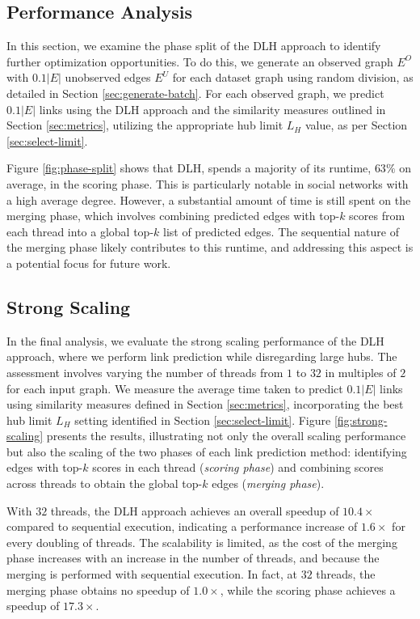 \subsection{Performance Analysis}

In this section, we examine the phase split of the DLH approach to identify further optimization opportunities. To do this, we generate an observed graph $E^O$ with $0.1|E|$ unobserved edges $E^U$ for each dataset graph using random division, as detailed in Section \ref{sec:generate-batch}. For each observed graph, we predict $0.1|E|$ links using the DLH approach and the similarity measures outlined in Section \ref{sec:metrics}, utilizing the appropriate hub limit $L_H$ value, as per Section \ref{sec:select-limit}.

Figure \ref{fig:phase-split} shows that DLH, spends a majority of its runtime, $63\%$ on average, in the scoring phase. This is particularly notable in social networks with a high average degree. However, a substantial amount of time is still spent on the merging phase, which involves combining predicted edges with top-$k$ scores from each thread into a global top-$k$ list of predicted edges. The sequential nature of the merging phase likely contributes to this runtime, and addressing this aspect is a potential focus for future work.




\subsection{Strong Scaling}

In the final analysis, we evaluate the strong scaling performance of the DLH approach, where we perform link prediction while disregarding large hubs. The assessment involves varying the number of threads from $1$ to $32$ in multiples of $2$ for each input graph. We measure the average time taken to predict $0.1|E|$ links using similarity measures defined in Section \ref{sec:metrics}, incorporating the best hub limit $L_H$ setting identified in Section \ref{sec:select-limit}. Figure \ref{fig:strong-scaling} presents the results, illustrating not only the overall scaling performance but also the scaling of the two phases of each link prediction method: identifying edges with top-$k$ scores in each thread (\textit{scoring phase}) and combining scores across threads to obtain the global top-$k$ edges (\textit{merging phase}).

With $32$ threads, the DLH approach achieves an overall speedup of $10.4\times$ compared to sequential execution, indicating a performance increase of $1.6\times$ for every doubling of threads. The scalability is limited, as the cost of the merging phase increases with an increase in the number of threads, and because the merging is performed with sequential execution. In fact, at $32$ threads, the merging phase obtains no speedup of $1.0\times$, while the scoring phase achieves a speedup of $17.3\times$.
